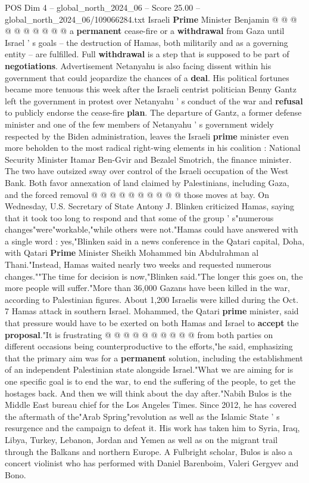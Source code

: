 \begin{textsample}{POS Dim 4 – global\_north\_2024\_06 – Score 25.00 – global\_north\_2024\_06/109066284.txt}
Israeli \textbf{Prime} Minister Benjamin @ @ @ @ @ @ @ @ @ @ a \textbf{permanent} cease-fire or a \textbf{withdrawal} from Gaza until Israel ' s goals -- the destruction of Hamas, both militarily and as a governing entity -- are fulfilled.
Full \textbf{withdrawal} is a step that is supposed to be part of \textbf{negotiations}.
Advertisement Netanyahu is also facing dissent within his government that could jeopardize the chances of a \textbf{deal}.
His political fortunes became more tenuous this week after the Israeli centrist politician Benny Gantz left the government in protest over Netanyahu ' s conduct of the war and \textbf{refusal} to publicly endorse the cease-fire \textbf{plan}.
The departure of Gantz, a former defense minister and one of the few members of Netanyahu ' s government widely respected by the Biden administration, leaves the Israeli \textbf{prime} minister even more beholden to the most radical right-wing elements in his coalition : National Security Minister Itamar Ben-Gvir and Bezalel Smotrich, the finance minister.
The two have outsized sway over control of the Israeli occupation of the West Bank.
Both favor annexation of land claimed by Palestinians, including Gaza, and the forced removal @ @ @ @ @ @ @ @ @ @ those moves at bay.
On Wednesday, U.S.
Secretary of State Antony J.
Blinken criticized Hamas, saying that it took too long to respond and that some of the group ' s"numerous changes"were"workable,"while others were not."Hamas could have answered with a single word : yes,"Blinken said in a news conference in the Qatari capital, Doha, with Qatari \textbf{Prime} Minister Sheikh Mohammed bin Abdulrahman al Thani."Instead, Hamas waited nearly two weeks and requested numerous changes.""The time for decision is now,"Blinken said."The longer this goes on, the more people will suffer."More than 36,000 Gazans have been killed in the war, according to Palestinian figures.
About 1,200 Israelis were killed during the Oct. 7 Hamas attack in southern Israel.
Mohammed, the Qatari \textbf{prime} minister, said that pressure would have to be exerted on both Hamas and Israel to \textbf{accept} the \textbf{proposal}."It is frustrating @ @ @ @ @ @ @ @ @ @ from both parties on different occasions being counterproductive to the efforts,"he said, emphasizing that the primary aim was for a \textbf{permanent} solution, including the establishment of an independent Palestinian state alongside Israel."What we are aiming for is one specific goal is to end the war, to end the suffering of the people, to get the hostages back.
And then we will think about the day after."Nabih Bulos is the Middle East bureau chief for the Los Angeles Times.
Since 2012, he has covered the aftermath of the"Arab Spring"revolution as well as the Islamic State ' s resurgence and the campaign to defeat it.
His work has taken him to Syria, Iraq, Libya, Turkey, Lebanon, Jordan and Yemen as well as on the migrant trail through the Balkans and northern Europe.
A Fulbright scholar, Bulos is also a concert violinist who has performed with Daniel Barenboim, Valeri Gergyev and Bono.


\end{textsample}
